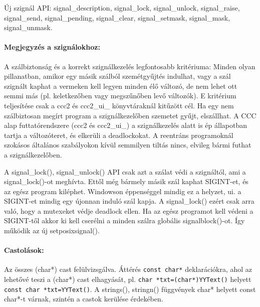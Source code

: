 \begin{description}
    Új szignál API: 
        signal\_description, signal\_lock, signal\_unlock,
        signal\_raise, signal\_send, signal\_pending, signal\_clear, 
        signal\_setmask, signal\_mask, signal\_unmask.

  \paragraph{Megjegyzés a szignálokhoz:}
    A szálbiztonság és a korrekt szignálkezelés legfontosabb
    kritériuma: Minden olyan pillanatban, amikor egy másik 
    szálból szemétgyűjtés indulhat, vagy a szál szignált kaphat 
    a vermeken kell legyen minden élő változó, de nem lehet 
    ott semmi más (pl. keletkezőben vagy megszűnőben levő változók). 
    E kritérium  teljesítése csak a ccc2 és ccc2\_ui\_ könyvtáraknál 
    kitűzött cél. Ha egy nem szálbiztosan megírt program 
    a szignálkezelőben  szemetet gyűjt, elszállhat.
    A CCC alap futtatórendszere (ccc2 és ccc2\_ui\_) a szignálkezelés 
    alatt is ép állapotban tartja a változóteret, és elkerüli 
    a deadlockokat.  A reentráns programoknál szokásos általános
    szabályokon kívül semmilyen tiltás nincs, elvileg  bármi
    futhat a szignálkezelőben.

    A signal\_lock(), signal\_unlock() API csak azt a szálat védi
    a szignáltól, ami a signal\_lock()-ot meghívta. Ettől még bármely
    másik szál kaphat SIGINT-et, és az egész program kiléphet.
    Windowson éppenséggel mindig ez a helyzet, ui. a SIGINT-et
    mindig egy újonnan induló szál kapja. A signal\_lock() ezért
    csak arra való, hogy a mutexeket védje deadlock ellen.
    Ha az egész programot kell védeni a SIGINT-től akkor ki kell
    cserélni a minden szálra globális signalblock()-ot. Így
    működik az új setposixsignal().

  \paragraph{Castolások:}
    Az összes (char*) cast felülvizsgálva.
    Áttérés \verb!const char*! deklarációkra, ahol az lehetővé teszi 
    a  (char*) cast elhagyását, pl. \verb!char *txt=(char*)YYText()! 
    helyett   \verb!const char *txt=YYText()!.
    A strings(), stringn() függvények char* helyett const char*-t 
    várnak, szintén a castok kerülése érdekében.
    

\end{description}
